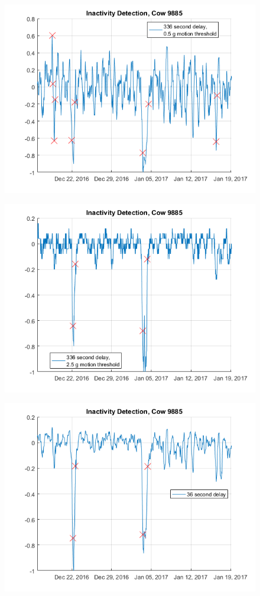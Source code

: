 \begin{figure}[]
\centering
\includegraphics[width = 0.75 \textwidth]{figures/InactivityDetectionCow9885_336period05threshold.png}
\caption{}
\label{InactivityDetectionCow9885_336period05threshold}
\end{figure}

\begin{figure}[htb]
\centering
\includegraphics[width = 0.75 \textwidth]{figures/InactivityDetectionCow9885_336period2_5threshold.png}
\caption{}
\label{InactivityDetectionCow9885_336period2_5threshold}
\end{figure}

\begin{figure}[htb]
\centering
\includegraphics[width = 0.75 \textwidth]{figures/InactivityDetectionCow9885_36period.png}
\caption{}
\label{InactivityDetectionCow9885_36period}
\end{figure}

